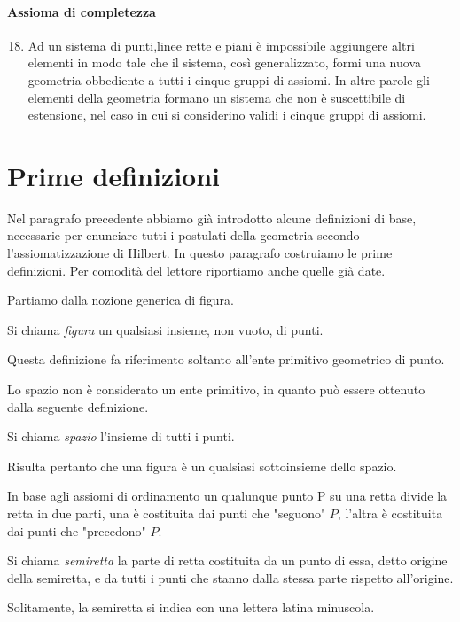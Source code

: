 {\paragraph{Assioma di completezza}

\begin{enumerate}[label=\Roman{*}.]
\setcounter{enumi}{17}
\item Ad un sistema di punti,linee rette e piani è impossibile aggiungere altri elementi in modo tale che il sistema, così generalizzato, formi una nuova geometria obbediente a tutti i cinque gruppi di assiomi. In altre parole gli elementi della geometria formano un sistema che non è suscettibile di estensione, nel caso in cui si considerino validi i cinque gruppi di assiomi.
\end{enumerate}

\section{Prime definizioni}

Nel paragrafo precedente abbiamo già introdotto alcune definizioni di base, necessarie per enunciare tutti i postulati della geometria secondo l'assiomatizzazione di Hilbert. In questo paragrafo costruiamo le prime definizioni. Per comodità del lettore riportiamo anche quelle già date.

Partiamo dalla nozione generica di figura.
\begin{definizione}
Si chiama \emph{figura} un qualsiasi insieme, non vuoto, di punti.
\end{definizione}
Questa definizione fa riferimento soltanto all'ente primitivo geometrico di punto.

Lo spazio non è considerato un ente primitivo, in quanto può essere ottenuto dalla seguente definizione.
\begin{definizione}
Si chiama \emph{spazio} l'insieme di tutti i punti.
\end{definizione}
Risulta pertanto che una figura è un qualsiasi sottoinsieme dello spazio.

In base agli assiomi di ordinamento un qualunque punto P su una retta divide la retta in due parti, una è costituita dai punti che "seguono" $ P $, l’altra è costituita dai punti che "precedono" $ P $.
\begin{definizione}
Si chiama \emph{semiretta} la parte di retta costituita da un punto di essa, detto origine della semiretta, e da tutti i punti che stanno dalla stessa parte rispetto all'origine.
\end{definizione}
Solitamente, la semiretta si indica con una lettera latina minuscola.

}
